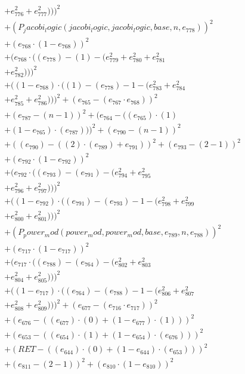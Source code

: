 \documentclass[10pt, a4paper]{article}
\begin{document}
\begin{small}
\begin{align*}
& + e_{776}^{2} + e_{777}^{2})))^{2} \\
& + (P_jacobi_logic(jacobi_logic, jacobi_logic, base, n, e_{778}))^{2} \\
& + (e_{768}  \cdot  (1 - e_{768}))^{2} \\
& + (e_{768}  \cdot  ((e_{778}) - (1) - (e_{779}^{2} + e_{780}^{2} + e_{781}^{2} \\
& + e_{782}^{2})))^{2} \\
& + ((1 - e_{768})  \cdot  ((1) - (e_{778}) - 1 - (e_{783}^{2} + e_{784}^{2} \\
& + e_{785}^{2} + e_{786}^{2})))^{2} + (e_{765} - (e_{767}  \cdot  e_{768}))^{2} \\
& + (e_{787} - (n - 1))^{2} + (e_{764} - ((e_{765})  \cdot  (1) \\
& + (1 - e_{765})  \cdot  (e_{787})))^{2} + (e_{790} - (n - 1))^{2} \\
& + ((e_{790}) - ((2)  \cdot  (e_{789}) + e_{791}))^{2} + (e_{793} - (2 - 1))^{2} \\
& + (e_{792}  \cdot  (1 - e_{792}))^{2} \\
& + (e_{792}  \cdot  ((e_{793}) - (e_{791}) - (e_{794}^{2} + e_{795}^{2} \\
& + e_{796}^{2} + e_{797}^{2})))^{2} \\
& + ((1 - e_{792})  \cdot  ((e_{791}) - (e_{793}) - 1 - (e_{798}^{2} + e_{799}^{2} \\
& + e_{800}^{2} + e_{801}^{2})))^{2} \\
& + (P_power_mod(power_mod, power_mod, base, e_{789}, n, e_{788}))^{2} \\
& + (e_{717}  \cdot  (1 - e_{717}))^{2} \\
& + (e_{717}  \cdot  ((e_{788}) - (e_{764}) - (e_{802}^{2} + e_{803}^{2} \\
& + e_{804}^{2} + e_{805}^{2})))^{2} \\
& + ((1 - e_{717})  \cdot  ((e_{764}) - (e_{788}) - 1 - (e_{806}^{2} + e_{807}^{2} \\
& + e_{808}^{2} + e_{809}^{2})))^{2} + (e_{677} - (e_{716}  \cdot  e_{717}))^{2} \\
& + (e_{676} - ((e_{677})  \cdot  (0) + (1 - e_{677})  \cdot  (1)))^{2} \\
& + (e_{653} - ((e_{654})  \cdot  (1) + (1 - e_{654})  \cdot  (e_{676})))^{2} \\
& + (RET - ((e_{644})  \cdot  (0) + (1 - e_{644})  \cdot  (e_{653})))^{2} \\
& + (e_{811} - (2 - 1))^{2} + (e_{810}  \cdot  (1 - e_{810}))^{2} \\

\end{align*}
\end{small}
\end{document}
